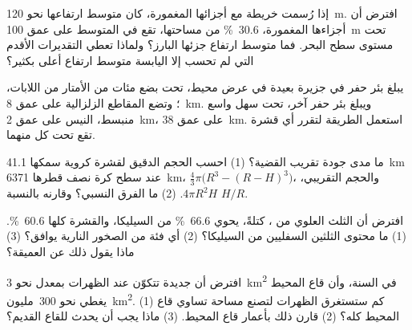 \begin{exercise}[$\star\star$]\label{exo:g12:continental-crust:10}
إذا رُسمت خريطة  مع أجزائها المغمورة، كان متوسط ارتفاعها
نحو \qty{120}{m}. افترض أن أجزاءها المغمورة، \qty{30.6}{\percent} من
مساحتها، تقع في المتوسط على عمق \qty{100}{m} تحت مستوى سطح البحر. فما متوسط ارتفاع
جزئها البارز؟ ولماذا تعطي التقديرات الأقدم التي لم تحسب إلا اليابسة
متوسط ارتفاع أعلى بكثير؟
\end{exercise}

\begin{exercise}[$\star\star$]\label{exo:g12:continental-crust:11}
يبلغ بئر حفر في جزيرة بعيدة في عرض محيط، تحت بضع مئات من
الأمتار من اللابات، ؛ وتضع المقاطع الزلزالية  على عمق \qty{8}{km}.
ويبلغ بئر حفر آخر، تحت سهل واسع منبسط، النيس على عمق \qty{2}{km}،
 على عمق \qty{38}{km}. استعمل الطريقة لتقرر أي قشرة
تقع تحت كل منهما.
\end{exercise}

\begin{exercise}[$\star\star\star$]\label{exo:g12:continental-crust:12}
ما مدى جودة تقريب القضية؟ (1) احسب الحجم الدقيق
لقشرة كروية سمكها \qty{41.1}{km} عند سطح كرة نصف
قطرها \qty{6371}{km}، $\tfrac{4}{3}\pi\bigl(R^3 - (R - H)^3\bigr)$،
والحجم التقريبي، $4\pi R^2 H$. (2) ما الفرق النسبي؟ وقارنه
بالنسبة $H/R$.
\end{exercise}

\begin{exercise}[$\star\star\star$]\label{exo:g12:continental-crust:13}
افترض أن الثلث العلوي من ، كتلةً، يحوي
\qty{66.6}{\percent} من السيليكا، والقشرة كلها \qty{60.6}{\percent}. (1)
ما محتوى الثلثين السفليين من السيليكا؟ (2) أي فئة من
الصخور النارية يوافق؟ (3) ماذا يقول ذلك عن  العميقة؟
\end{exercise}

\begin{exercise}[$\star\star\star$]\label{exo:g12:continental-crust:14}
افترض أن  جديدة تتكوّن عند الظهرات بمعدل نحو \qty{3}{km^2} في
السنة، وأن قاع المحيط يغطي نحو \num{300}~مليون~\unit{km^2}. (1)
كم ستستغرق الظهرات لتصنع مساحة تساوي قاع المحيط
كله؟ (2) قارن ذلك بأعمار قاع المحيط. (3) ماذا يجب أن يحدث
للقاع القديم؟
\end{exercise}

